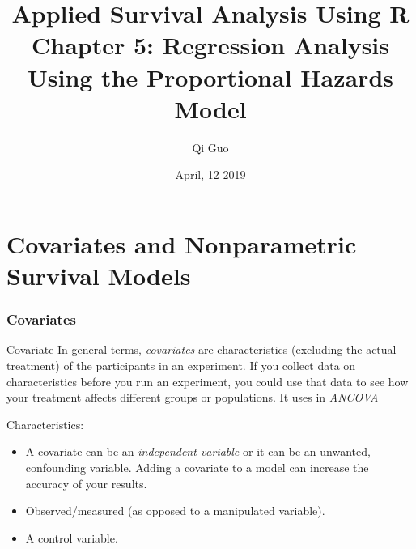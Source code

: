 \documentclass{beamer}
\title[Survival Analysis]{Applied Survival Analysis Using R\\ Chapter 5: Regression Analysis Using the Proportional Hazards Model}
\author[Qi Guo]{Qi Guo}
\institute[UTD]{Department of Mathematical Sciences \\ 
	The University of Texas at Dallas}
\date{April, 12 2019}
\newcommand{\empr}[1]{{\emph{\color{red}#1}}}
\begin{document}
\begin{frame}
  \titlepage
\end{frame}

\bgroup
{}


\section[Outline]{}
\begin{frame}
  \tableofcontents
\end{frame}

\section{Covariates and Nonparametric Survival Models}
\begin{frame}
\frametitle{Covariates}
\begin{defblock}{Covariate}
In general terms, \empr{covariates} are characteristics (excluding the actual treatment) of the participants in an experiment. If you collect data on characteristics before you run an experiment, you could use that data to see how your treatment affects different groups or populations. It uses in \empr{ANCOVA}
\end{defblock}
Characteristics:
\begin{itemize}
\item A covariate can be an \empr{independent variable} or it can be an unwanted, confounding variable. Adding a covariate to a model can increase the accuracy of your results.
\item Observed/measured (as opposed to a manipulated variable).
\item A control variable.
\end{itemize}
\end{frame}
\end{document}
